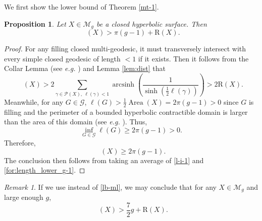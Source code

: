 \documentclass[UTF8]{amsart}
\newtheorem{proposition}[theorem]{Proposition}
\numberwithin{equation}{section}
\theoremstyle{definition}
\theoremstyle{example}
\theoremstyle{remark}
\newtheorem*{remark}{Remark}
\DeclareMathOperator{\arcsinh}{arcsinh}
\DeclareMathOperator{\area}{Area}
\DeclareMathOperator{\slfs}{\mathcal{L}_{sys}^{fill}}
\newcommand{\sM}{\mathcal{M}}
\begin{document}
We first show the lower bound of Theorem \ref{mt-1}.
\begin{proposition}\label{mt-lb}
Let $X\in \sM_g$ be a closed hyperbolic surface. Then
\[\slfs(X)>\pi(g-1)+\mathrm{R}(X).\]
\end{proposition}
\begin{proof}
	For any filling closed multi-geodesic, it must transversely intersect with every simple closed geodesic of length $<1$ if it exists. Then it follows from the Collar Lemma (see \emph{e.g.} \cite[Theorem 4.4.6]{buser2010geometry}) and Lemma \ref{lem:dist} that
\begin{equation}\label{l-i-1}
   \slfs(X)>2\sum_{\gamma \in \mathcal{P}(X), \ \ell(\gamma) <1}\arcsinh \left( \frac{1}{\sinh \left( \frac{1}{2}\ell(\gamma) \right) } \right)>2\mathrm{R}(X).
\end{equation}
Meanwhile, for any $G\in \mathcal{G}$, $\ell(G) > \frac{1}{2}\area(X) = 2\pi(g-1)>0$ since $G$ is filling and the perimeter of a bounded hyperbolic contractible domain is larger than the area of this domain (see \emph{e.g.} \cite[Section 8.1 Page 211]{buser2010geometry}). Thus, 
    \begin{equation}\label{lb-ml}
       \inf\limits_{G\in \mathcal{G}} \ell(G) \geq 2\pi(g-1)> 0.   
    \end{equation}
 Therefore, 
	\begin{equation}\label{for:length_lower_g-1}
		\slfs(X) \geq 2\pi(g-1).
	\end{equation}
     The conclusion then follows from taking an average of \eqref{l-i-1} and \eqref{for:length_lower_g-1}.
\end{proof}
\begin{remark}
If we use \cite[Theorem 1.1]{gao2025shortest} instead of \eqref{lb-ml}, we may conclude that for any $X\in \sM_g$ and large enough $g$,
\[\slfs(X)>\frac{7}{2}g+\mathrm{R}(X).\]
\end{remark}
\end{document}
